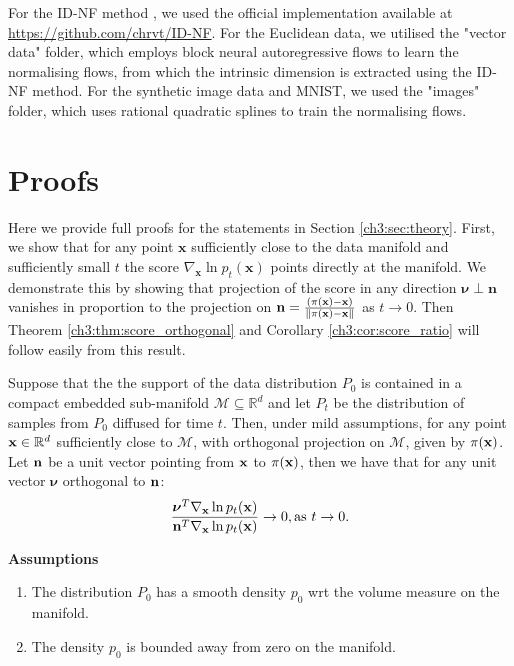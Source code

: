 For the ID-NF method \cite{horvat2022nfid}, we used the official implementation available at \url{https://github.com/chrvt/ID-NF}. For the Euclidean data, we utilised the "vector data" folder, which employs block neural autoregressive flows to learn the normalising flows, from which the intrinsic dimension is extracted using the ID-NF method. For the synthetic image data and MNIST, we used the "images" folder, which uses rational quadratic splines to train the normalising flows.

\section{Proofs}
\label{ch3:appendix:proof}
Here we provide full proofs for the statements in Section \ref{ch3:sec:theory}. First, we show that for any point $\textbf{x}$ sufficiently close to the data manifold and sufficiently small $t$ the score $\nabla_\textbf{x} \ln p_t(\textbf{x})$ points directly at the manifold. We demonstrate this by showing that projection of the score in any direction $\boldsymbol{\nu} \perp \textbf{n}$ vanishes in proportion to the projection on $\textbf{n} = \frac{(\pi(\textbf{x}) - \textbf{x})}{\left\lVert \pi(\textbf{x}) -\textbf{x} \right\rVert}$ as $t \to 0$. Then Theorem \ref{ch3:thm:score_orthogonal} and Corollary \ref{ch3:cor:score_ratio} will follow easily from this result.

\begin{theorem}
\label{ch3:thm:master_thm}
Suppose that the the support of the data distribution $P_0$ is contained in a compact embedded sub-manifold $\mathcal{M} \subseteq \mathbb{R}^d$ and let $P_t$ be the distribution of samples from $P_0$ diffused for time $t$. Then, under mild assumptions, for any point $\textup{\textbf{x}} \in \mathbb{R}^d$ sufficiently close to $\mathcal{M}$, with orthogonal projection on $\mathcal{M}$, given by $\pi(\textup{\textbf{x}})$. Let $\textup{\textbf{n}}$ be a unit vector pointing from $\textup{\textbf{x}}$ to $\pi(\textup{\textbf{x}})$, then we have that for any unit vector $\boldsymbol{\nu}$ orthogonal to $\textup{\textbf{n}}$: 
\begin{gather*}
    \frac{\boldsymbol{\nu}^T \nabla_\textup{\textbf{x}} \ln p_t(\textup{\textbf{x}})}{\textup{\textbf{n}}^T \nabla_\textup{\textbf{x}} \ln p_t(\textup{\textbf{x}})} \to 0, \text{as } t \to 0.
\end{gather*}
\end{theorem}

\textbf{Assumptions}
\begin{enumerate}
    \item The distribution $P_0$ has a smooth density $p_0$ wrt the volume measure on the manifold.
    \item The density $p_0$ is bounded away from zero on the manifold.
\end{enumerate}

